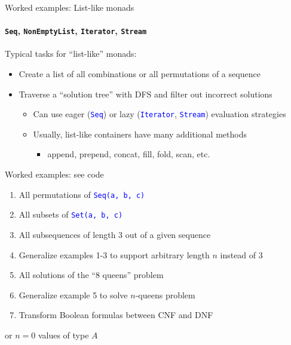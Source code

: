 \documentclass[english]{beamer}
\begin{document}
\begin{frame}{Worked examples: List-like monads}


\framesubtitle{\texttt{\footnotesize{}Seq}, \texttt{\footnotesize{}NonEmptyList},
\texttt{\footnotesize{}Iterator}, \texttt{\footnotesize{}Stream}}

Typical tasks for ``list-like'' monads:
\begin{itemize}
\item Create a list of all combinations or all permutations of a sequence
\item Traverse a ``solution tree'' with DFS and filter out incorrect solutions
\begin{itemize}
\item Can use eager (\texttt{\textcolor{blue}{\footnotesize{}Seq}}) or lazy
(\texttt{\textcolor{blue}{\footnotesize{}Iterator}}, \texttt{\textcolor{blue}{\footnotesize{}Stream}})
evaluation strategies
\item Usually, list-like containers have many additional methods
\begin{itemize}
\item append, prepend, concat, fill, fold, scan, etc.
\end{itemize}
\end{itemize}
\end{itemize}
Worked examples: see code
\begin{enumerate}
\item All permutations of \texttt{\textcolor{blue}{\footnotesize{}Seq(\textquotedbl{}a\textquotedbl{},
\textquotedbl{}b\textquotedbl{}, \textquotedbl{}c\textquotedbl{})}} 
\item All subsets of \texttt{\textcolor{blue}{\footnotesize{}Set(\textquotedbl{}a\textquotedbl{},
\textquotedbl{}b\textquotedbl{}, \textquotedbl{}c\textquotedbl{})}} 
\item All subsequences of length 3 out of a given sequence
\item Generalize examples 1-3 to support arbitrary length $n$ instead of
3
\item All solutions of the ``8 queens'' problem
\item Generalize example 5 to solve $n$-queens problem
\item Transform Boolean formulas between CNF and DNF 
\end{enumerate}
\end{frame}
                                                                                                                                                                                                                                                                                     or $n=0$ values of type $A$
\end{document}
